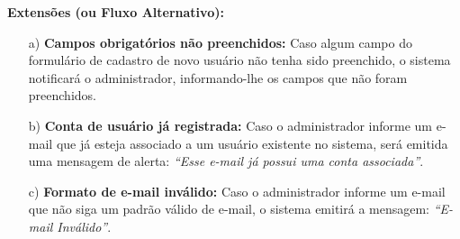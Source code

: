 \begin{quadro}[H]
\begin{framed}
\begin{flushleft}
		\textbf{Extensões (ou Fluxo Alternativo):}
		\begin{itemize}
			\item[a)] \textbf{Campos obrigatórios não preenchidos:} Caso algum campo do formulário de cadastro de novo usuário não tenha sido preenchido, o sistema notificará o administrador, informando-lhe os campos que não foram preenchidos.
			\item[b)] \textbf{Conta de usuário já registrada:} Caso o administrador informe um e-mail que já esteja associado a um usuário existente no sistema, será emitida uma mensagem de alerta: \textit{``Esse e-mail já possui uma conta associada''}.
			\item[c)] \textbf{Formato de e-mail inválido:} Caso o administrador informe um e-mail que não siga um padrão válido de e-mail, o sistema emitirá a mensagem: \textit{``E-mail Inválido''}.
		\end{itemize}
		\end{flushleft}
	\end{framed}
\end {quadro} %

